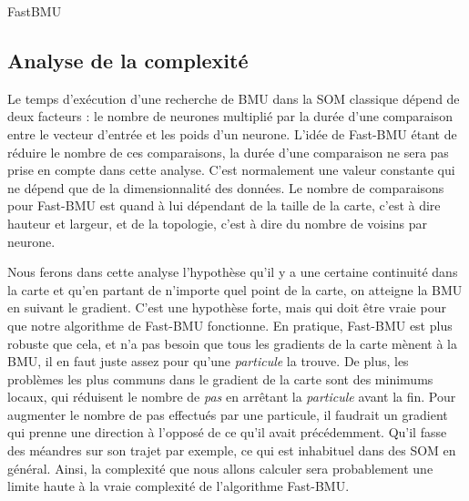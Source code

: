 	\begin{algorithm}
	\caption{FastBMU}
	\label{fast:alg:bmu}
	\DontPrintSemicolon

	\end{algorithm}

	\subsection{Analyse de la complexité}\label{seq:complex_analysis}

	Le temps d'exécution d'une recherche de BMU dans la SOM classique dépend de deux facteurs : le nombre de neurones multiplié par la durée d'une comparaison entre le vecteur d'entrée et les poids d'un neurone. L'idée de Fast-BMU étant de réduire le nombre de ces comparaisons, la durée d'une comparaison ne sera pas prise en compte dans cette analyse. C'est normalement une valeur constante qui ne dépend que de la dimensionnalité des données. Le nombre de comparaisons pour Fast-BMU est quand à lui dépendant de la taille de la carte, c'est à dire hauteur et largeur, et de la topologie, c'est à dire du nombre de voisins par neurone. 

	Nous ferons dans cette analyse l'hypothèse qu'il y a une certaine continuité dans la carte et qu'en partant de n'importe quel point de la carte, on atteigne la BMU en suivant le gradient. C'est une hypothèse forte, mais qui doit être vraie pour que notre algorithme de Fast-BMU fonctionne. En pratique, Fast-BMU est plus robuste que cela, et n'a pas besoin que tous les gradients de la carte mènent à la BMU, il en faut juste assez pour qu'une \textit{particule} la trouve. De plus, les problèmes les plus communs dans le gradient de la carte sont des minimums locaux, qui réduisent le nombre de \textit{pas} en arrêtant la \textit{particule} avant la fin. Pour augmenter le nombre de pas effectués par une particule, il faudrait un gradient qui prenne une direction à l'opposé de ce qu'il avait précédemment. Qu'il fasse des méandres sur son trajet par exemple, ce qui est inhabituel dans des SOM en général. Ainsi, la complexité que nous allons calculer sera probablement une limite haute à la vraie complexité de l'algorithme Fast-BMU. 

